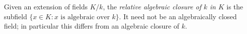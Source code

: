 
Given an extension of fields $K/k$, the \emph{relative algebraic closure of $k$ in $K$} is the subfield $\{x\in K:x\text{ is algebraic over }k\}$. It need not be an algebraically closed field; in particular this differs from an algebraic closure of $k$.
